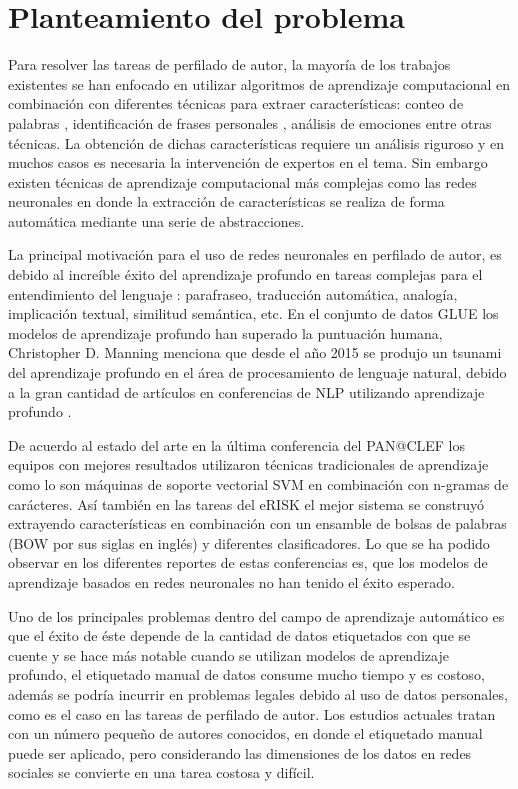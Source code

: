 \section{Planteamiento del problema}

Para resolver las tareas de perfilado de autor, la mayoría de los trabajos existentes se han enfocado en utilizar algoritmos de aprendizaje computacional en combinación con diferentes técnicas para extraer características: conteo de palabras \citep{Laserna2014}, identificación de frases personales \citep{Ortega-Mendoza2018}, análisis de emociones \citep{Aragon2019} entre otras técnicas. La obtención de dichas características requiere un análisis riguroso y en muchos casos es necesaria la intervención de expertos en el tema. Sin embargo existen técnicas de aprendizaje computacional más complejas como las redes neuronales en donde la extracción de características se realiza de forma automática mediante una serie de abstracciones.

La principal motivación para el uso de redes neuronales en perfilado de autor, es debido al increíble éxito del aprendizaje profundo en tareas complejas para el entendimiento del lenguaje : parafraseo, traducción automática, analogía, implicación  textual, similitud semántica, etc. En el conjunto de datos GLUE \citep{wang2018glue} los modelos de aprendizaje profundo han superado la puntuación humana, Christopher D. Manning menciona que desde el año 2015 se produjo un tsunami del aprendizaje profundo en el área de procesamiento de lenguaje natural, debido a la gran cantidad de artículos en conferencias de NLP utilizando aprendizaje profundo \citep{Manning2015}.

De acuerdo al estado del arte en la última conferencia del PAN@CLEF los equipos con mejores resultados utilizaron técnicas tradicionales de aprendizaje como lo son máquinas de soporte vectorial SVM en combinación con n-gramas de carácteres. Así también en las tareas del eRISK el mejor sistema se construyó extrayendo características en combinación con un ensamble de bolsas de palabras (BOW por sus siglas en inglés) y diferentes clasificadores. Lo que se ha podido observar en los diferentes reportes de estas conferencias es, que los modelos de aprendizaje basados en redes neuronales no han tenido el éxito esperado. 

Uno de los principales problemas dentro del campo de aprendizaje automático es que el éxito de éste depende de la cantidad de datos etiquetados con que se cuente y se hace más notable cuando se utilizan modelos de aprendizaje profundo, el etiquetado manual de datos consume mucho tiempo y es costoso, además se podría incurrir en problemas legales debido al uso de datos personales, como es el caso en las tareas de perfilado de autor. Los estudios actuales  tratan con un número pequeño de autores conocidos, en donde el etiquetado manual puede ser aplicado, pero considerando las dimensiones de los datos en redes sociales se convierte en una tarea costosa y difícil.

